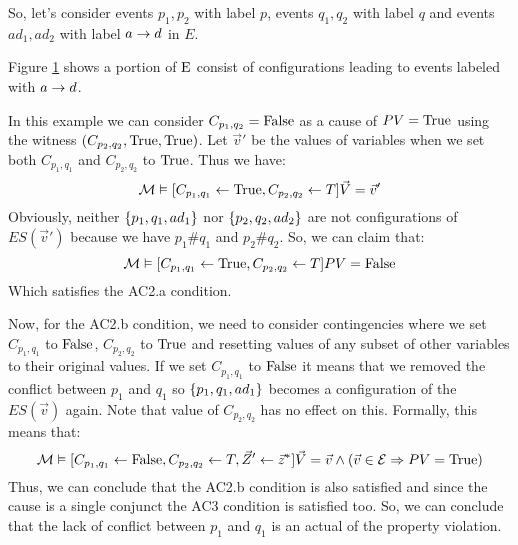 \begin{example}
    So, let's consider events $p_1,p_2$ with label $p$,
    events $q_1,q_2$ with label $q$ and events $ad_1,ad_2$ 
    with label $a \rightarrow d$ in $E$.
    \begin{figure}
        \centering
        \caption{}
        \label{fig:blacklist:es}
    \end{figure}
    Figure \ref{fig:blacklist:es} shows a portion of $\mathrm{E}$ consist of
    configurations leading to events labeled with $a\rightarrow d$.

    In this example we can consider $C_{p_1,q_2} = \mathrm{False}$ as a cause of 
    $PV = \mathrm{True}$ using the witness $(C_{p_2,q_2},\mathrm{True},\mathrm{True})$.
    Let $\vec v'$ be the values of variables when we set both 
    $C_{p_1,q_1}$ and $C_{p_2,q_2}$ to $\mathrm{True}$.
    Thus we have:
    \begin{equation*}
        \mathcal{M} \vDash [C_{p_1,q_1} \leftarrow \mathrm{True}, C_{p_2,q_2} \leftarrow T] 
        \vec V = \vec v'
    \end{equation*}
    Obviously, neither $\{p_1,q_1,ad_1\}$ nor $\{p_2,q_2,ad_2\}$ 
    are not configurations of $ES(\vec v')$ because we have
    $p_1 \# q_1$ and $p_2 \# q_2$.
    So, we can claim that:
    \begin{equation*}
        \mathcal{M} \vDash [C_{p_1,q_1} \leftarrow \mathrm{True}, C_{p_2,q_2} \leftarrow T] 
        PV = \mathrm{False}
    \end{equation*}
    Which satisfies the AC2.a condition.

    Now, for the AC2.b condition, we need to consider contingencies 
    where we set $C_{p_1,q_1}$ to $\mathrm{False}$, $C_{p_2,q_2}$ to $\mathrm{True}$ and 
    resetting values of any subset of other variables to their 
    original values.
    If we set $C_{p_1,q_1}$ to $\mathrm{False}$ it means that we removed
    the conflict between $p_1$ and $q_1$ so $\{p_1,q_1,ad_1\}$ becomes
    a configuration of the $ES(\vec v)$ again.
    Note that value of $C_{p_2,q_2}$ has no effect on this.
    Formally, this means that:
    \begin{equation*}
        \mathcal{M} \vDash [C_{p_1,q_1} \leftarrow \mathrm{False}, C_{p_2,q_2} \leftarrow T
            ,\vec Z' \leftarrow \vec z^*
        ] \vec V = \vec v \wedge 
        (\vec v \in \mathcal{E} \Rightarrow PV = \mathrm{True})
    \end{equation*}
    Thus, we can conclude that the AC2.b condition is also satisfied 
    and since the cause is a single conjunct the AC3 condition is
    satisfied too.
    So, we can conclude that the lack of conflict between $p_1$ and 
    $q_1$ is an actual of the property violation. 


\end{example}